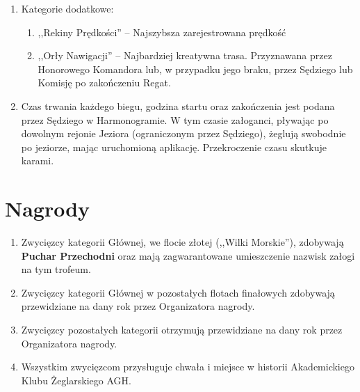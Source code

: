 \documentclass[12pt,a4paper]{article}
\begin{document}
\begin{enumerate}
\begin{enumerate}
        \item W każdej \textit{Flocie} załogi zajmują miejsca w zależności od długości przebytej trasy.
    \end{enumerate}
    \item Kategorie dodatkowe:
    \begin{enumerate}
        \item ,,Rekiny Prędkości'' -- Najszybsza zarejestrowana prędkość
        \item ,,Orły Nawigacji'' -- Najbardziej kreatywna trasa. Przyznawana przez Honorowego Komandora lub, w przypadku jego braku, przez Sędziego lub Komisję po zakończeniu Regat.
    \end{enumerate}
    \item Czas trwania każdego biegu, godzina startu oraz zakończenia jest podana przez Sędziego w Harmonogramie. W tym czasie załoganci, pływając po dowolnym rejonie Jeziora (ograniczonym przez Sędziego), żeglują swobodnie po jeziorze, mając uruchomioną aplikację. Przekroczenie czasu skutkuje karami.
\end{enumerate}



\section{Nagrody}
\begin{enumerate}
    \item Zwycięzcy kategorii Głównej, we flocie złotej (,,Wilki Morskie''), zdobywają \textbf{Puchar Przechodni} oraz mają zagwarantowane umieszczenie nazwisk załogi na tym trofeum.
    \item Zwycięzcy kategorii Głównej w pozostałych flotach finałowych zdobywają przewidziane na dany rok przez Organizatora nagrody.
    \item Zwycięzcy pozostałych kategorii otrzymują przewidziane na dany rok przez Organizatora nagrody.
    \item Wszystkim zwycięzcom przysługuje chwała i miejsce w historii Akademickiego Klubu Żeglarskiego AGH. 
\end{enumerate}
\end{document}
